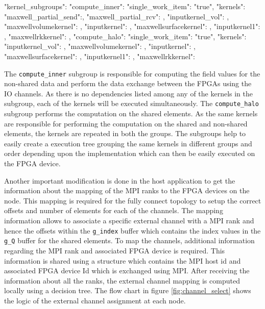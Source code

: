 \begin{JsonCode}[caption=Kernel subgroups used in Multi FPGA design to enqueue kernels, frame=tlrb, label=code:subgroups]
"kernel_subgroups":
{
    "compute_inner":
    {
        "single_work_item": "true",
        "kernels":
        {
            "maxwell_partial_send":{},
            "maxwell_partial_rcv": {},
            "inputkernel_vol": {},
            "maxwellvolumekernel": {},
            "inputkernel": {},
            "maxwellsurfacekernel": {},
            "inputkernel1": {},
            "maxwellrkkernel": {}
        }
    },
    "compute_halo":
    {
        "single_work_item": "true",
        "kernels":
        {
            "inputkernel_vol": {},
            "maxwellvolumekernel": {},
            "inputkernel": {},
            "maxwellsurfacekernel": {},
            "inputkernel1": {},
            "maxwellrkkernel": {}
        }
    }
}
\end{JsonCode}

The \texttt{compute\_inner} subgroup is responsible for computing the field values for the non-shared
data and perform the data exchange between the FPGAs using the IO channels. As there is no dependencies
listed among any of the kernels in the subgroup, each of the kernels will be executed simultaneously.
The \texttt{compute\_halo} subgroup performs the computation on the shared elements. As the same kernels
are responsible for performing the computation on the shared and non-shared elements, the kernels are
repeated in both the groups. The subgroups help to easily create a execution tree grouping
the same kernels in different groups and order depending upon the implementation which can then be
easily executed on the FPGA device.

Another important modification is done in the host application to get the information about
the mapping of the MPI ranks to the FPGA devices on the node. This mapping is required for the
fully connect topology to setup the correct offsets and number of elements for each of the channels.
The mapping information allows to associate a specific external channel with a MPI rank and hence the
offsets within the \texttt{g\_index} buffer which contains the index values in the \texttt{g\_Q}
buffer for the shared elements. To map the channels, additional information
regarding the MPI rank and associated FPGA device is required. This information is shared using
a structure which contains the MPI host id and associated FPGA device Id which is exchanged
using MPI. After receiving the information about all the ranks, the external channel mapping
is computed locally using a decision tree. The flow chart in figure \ref{fig:channel_select}
shows the logic of the external channel assignment at each node.

